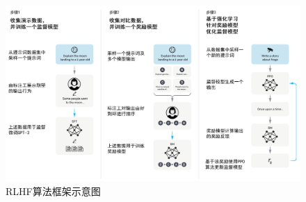 \begin{figure}[htbp]
	\centering
	\includegraphics[scale=0.5]{Fig/rlhf_framework.png}
	\caption{\label{rlhf_framework}RLHF算法框架示意图\cite{DBLP:conf/nips/Ouyang0JAWMZASR22}}
\end{figure}

